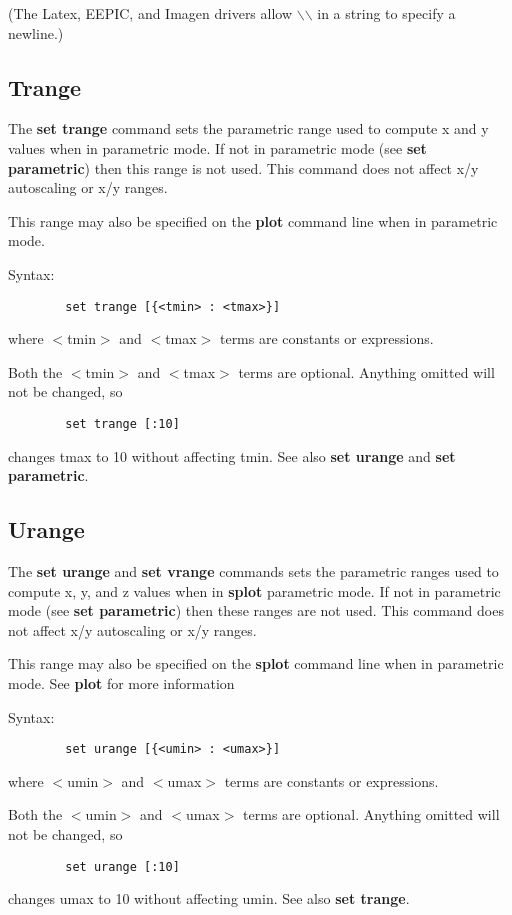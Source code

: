 (The Latex, EEPIC, and Imagen drivers allow $\backslash$$\backslash$ in a string to specify
a newline.)
\subsection{Trange}
The {\bf set trange} command sets the parametric range used to compute
x and y values when in parametric mode. If not in parametric mode
(see {\bf set parametric}) then this range is not used. This command
does not affect x/y autoscaling or x/y ranges.

This range may also be specified on the {\bf plot} command line when
in parametric mode.

Syntax:
\begin{verbatim}
        set trange [{<tmin> : <tmax>}]
\end{verbatim}

where $<$tmin$>$ and $<$tmax$>$ terms are constants or expressions.

Both the $<$tmin$>$ and $<$tmax$>$ terms are optional. Anything omitted will
not be changed, so 
\begin{verbatim}
        set trange [:10]
\end{verbatim}
changes tmax to 10 without affecting tmin.  See also {\bf set urange} and
{\bf set parametric}.
\subsection{Urange}
The {\bf set urange} and {\bf set vrange} commands sets the parametric ranges used 
to compute x, y, and z values when in {\bf splot} parametric mode. If not in 
parametric mode (see {\bf set parametric}) then these ranges are not used. This 
command does not affect x/y autoscaling or x/y ranges.

This range may also be specified on the {\bf splot} command line when
in parametric mode.  See {\bf plot} for more information

Syntax:
\begin{verbatim}
        set urange [{<umin> : <umax>}]
\end{verbatim}

where $<$umin$>$ and $<$umax$>$ terms are constants or expressions.

Both the $<$umin$>$ and $<$umax$>$ terms are optional. Anything omitted will
not be changed, so 
\begin{verbatim}
        set urange [:10]
\end{verbatim}
changes umax to 10 without affecting umin.  See also {\bf set trange}.
